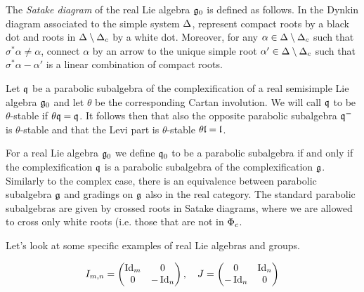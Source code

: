 The \emph{Satake diagram} of the real Lie algebra $\mathfrak{g}_0$ is defined as follows. In the Dynkin diagram associated to the simple system $\Delta$, represent compact roots by a black dot and roots in $\Delta\setminus\Delta_c$ by a white dot. Moreover, for any $\alpha\in\Delta\setminus\Delta_c$ such that $\sigma^*\alpha\neq\alpha$, connect $\alpha$ by an arrow  to the unique simple root $\alpha'\in\Delta\setminus\Delta_c$ such that $\sigma^*\alpha -\alpha'$ is a linear combination of compact roots.




\begin{definition}\label{def:thetastableparabolic}
 Let $\mathfrak{q}$ be a parabolic subalgebra of the complexification of a real semisimple Lie algebra $\mathfrak{g}_0$ and let $\theta$ be the corresponding Cartan involution. We will call $\mathfrak{q}$ to be $\theta$-stable if $\theta \mathfrak{q} = \mathfrak{q}$. It follows then that also the opposite parabolic subalgebra $\mathfrak{q}^-$ is $\theta$-stable and that the Levi part is $\theta$-stable $\theta \mathfrak{l} = \mathfrak{l}$.
\end{definition}

For a real Lie algebra $\mathfrak{g}_0$ we define $\mathfrak{q}_0$ to be a parabolic subalgebra if and only if the complexification $\mathfrak{q}$ is a parabolic subalgebra of the complexification $\mathfrak{g}$. Similarly to the complex case, there is an equivalence between parabolic subalgebra $\mathfrak{g}$ and gradings on $\mathfrak{g}$ also in the real category. The standard parabolic subalgebras are given by crossed roots in Satake diagrams, where we are allowed to cross only white roots (i.e. those that are not in $\Phi_c$.


Let's look at some specific examples of real Lie algebras and groups.

\[
 I_{m,n} = \begin{pmatrix} \operatorname{\mathrm{Id}}_m & 0 \\ 0 & -\operatorname{\mathrm{Id}}_n \end{pmatrix}, \quad J = \begin{pmatrix} 0 & \operatorname{\mathrm{Id}}_n \\ -\operatorname{\mathrm{Id}}_n & 0 \end{pmatrix}
\]

